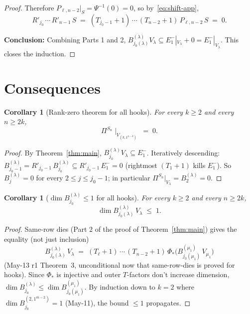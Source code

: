 \documentclass[11pt]{article}
\newtheorem{corollary}[theorem]{Corollary}
\theoremstyle{definition}
\begin{document}
\begin{proof}
Therefore $P_{\ell, n-2}|_S = \Psi^{-1}(0) = 0$, so by~\eqref{eq:shift-app},
\[
   R'_{j_0}\,\cdots\,R'_{n-1}\,S
   \;=\;
   (T_{j_0-1}+1)\,\cdots\,(T_{n-2}+1)\,P_{\ell, n-2}\,S
   \;=\; 0.
\]

\medskip\noindent\textbf{Conclusion:}  Combining Parts 1 and 2,
$B^{(\lambda)}_{j_0(\lambda)} V_\lambda \subseteq E_1^-|_{V_\lambda}
+ 0 = E_1^-|_{V_\lambda}$.  This closes the induction.
\end{proof}

\section{Consequences}\label{sec:consequences}

\begin{corollary}[Rank-zero theorem for all hooks]\label{cor:rank-zero}
For every $k \ge 2$ and every $n \ge 2k$,
\[
   \Pi^{S_n}\!\mid_{V_{(k, 1^{n-k})}} \;=\; 0.
\]
\end{corollary}

\begin{proof}
By Theorem~\ref{thm:main}, $B^{(\lambda)}_{j_0} V_\lambda \subseteq E_1^-$.
Iteratively descending: $B^{(\lambda)}_{j_0 - 1} = R'_{j_0 - 1}\,
B^{(\lambda)}_{j_0} \subseteq R'_{j_0 - 1}\,E_1^- = 0$ (rightmost
$(T_1+1)$ kills $E_1^-$).  So $B^{(\lambda)}_j = 0$ for every
$2 \le j \le j_0 - 1$; in particular $\Pi^{S_n}|_{V_\lambda} =
B^{(\lambda)}_2 = 0$.
\end{proof}

\begin{corollary}[$\dim B^{(\lambda)}_{j_0} \le 1$ for all hooks]\label{cor:dim-bound}
For every $k \ge 2$ and every $n \ge 2k$,
\[
   \dim B^{(\lambda)}_{j_0(\lambda)}\,V_\lambda \;\le\; 1.
\]
\end{corollary}

\begin{proof}
Same-row dies (Part 2 of the proof of Theorem~\ref{thm:main}) gives
the equality (not just inclusion)
\[
   B^{(\lambda)}_{j_0(\lambda)}\,V_\lambda
   \;=\;
   (T_\ell+1)\,\cdots\,(T_{n-2}+1)\,\Phi_*\!\big(B^{(\mu_1)}_{j_0(\mu_1)}\,V_{\mu_1}\big)
\]
(May-13 r1 Theorem~3, unconditional now that same-row-dies is proved
for hooks).  Since $\Phi_*$ is injective and outer $T$-factors don't
increase dimension, $\dim B^{(\lambda)}_{j_0} \le \dim B^{(\mu_1)}_{j_0(\mu_1)}$.
By induction down to $k = 2$ where $\dim B^{(2, 1^{m-2})}_{j_0} = 1$
(May-11), the bound $\le 1$ propagates.
\end{proof}
\end{document}
